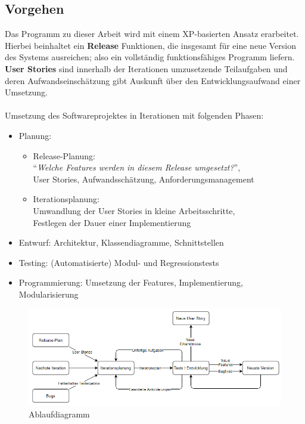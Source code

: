 \documentclass[11pt]{article}
\begin{document}
    \subsection{Vorgehen}
    Das Programm zu dieser Arbeit wird mit einem XP-basierten Ansatz erarbeitet.
    Hierbei beinhaltet ein \textbf{Release} Funktionen, die insgesamt für eine neue Version des Systems ausreichen;
    also ein vollständig funktionsfähiges Programm liefern.
    \textbf{User Stories} sind innerhalb der Iterationen umzusetzende Teilaufgaben und deren Aufwandseinschätzung gibt
    Auskunft über den Entwicklungsaufwand einer Umsetzung.\\~\\
    Umsetzung des Softwareprojektes in Iterationen mit folgenden Phasen:
    \begin{itemize}
        \item Planung:
        \begin{itemize}
            \item Release-Planung:\\"`\textit{Welche Features werden in diesem Release umgesetzt?}"',\\User Stories,
            Aufwandsschätzung, Anforderungsmanagement
            \item Iterationsplanung:\\Umwandlung der User Stories in kleine Arbeitsschritte,\\Festlegen der Dauer einer
            Implementierung
        \end{itemize}
        \item Entwurf: Architektur, Klassendiagramme, Schnittstellen
        \item Testing: (Automatisierte) Modul- und Regressionstests
        \item Programmierung: Umsetzung der Features, Implementierung, Modularisierung
    \end{itemize}
    \begin{figure}[H]
        \centering
        \includegraphics[width=15cm]{../images/extreme_programming.PNG}
        \caption{Ablaufdiagramm}
    \end{figure}
\end{document}
